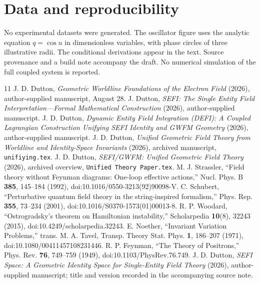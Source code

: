 \documentclass[11pt]{article}
\begin{document}
\section*{Data and reproducibility}
No experimental datasets were generated. The oscillator figure uses the analytic equation $q=\cos u$ in dimensionless variables, with phase circles of three illustrative radii. The conditional derivations appear in the text. Source provenance and a build note accompany the draft. No numerical simulation of the full coupled system is reported.
\begin{thebibliography}{11}
 J. D. Dutton, \textit{Geometric Worldline Foundations of the Electron Field} (2026), author-supplied manuscript, August 28.
 J. Dutton, \textit{SEFI: The Single Entity Field Interpretation---Formal Mathematical Construction} (2026), author-supplied manuscript.
 J. D. Dutton, \textit{Dynamic Entity Field Integration (DEFI): A Coupled Lagrangian Construction Unifying SEFI Identity and GWFM Geometry} (2026), author-supplied manuscript.
 J. D. Dutton, \textit{Unified Geometric Field Theory from Worldline and Identity-Space Invariants} (2026), archived manuscript, \texttt{unifiying.tex}.
 J. D. Dutton, \textit{SEFI/GWFM: Unified Geometric Field Theory} (2026), archived overview, \texttt{Unified Theory Paper.tex}.
 M. J. Strassler, ``Field theory without Feynman diagrams: One-loop effective actions,'' Nucl. Phys. B \textbf{385}, 145--184 (1992), doi:10.1016/0550-3213(92)90098-V.
 C. Schubert, ``Perturbative quantum field theory in the string-inspired formalism,'' Phys. Rep. \textbf{355}, 73--234 (2001), doi:10.1016/S0370-1573(01)00013-8.
 R. P. Woodard, ``Ostrogradsky's theorem on Hamiltonian instability,'' Scholarpedia \textbf{10}(8), 32243 (2015), doi:10.4249/scholarpedia.32243.
 E. Noether, ``Invariant Variation Problems,'' trans. M. A. Tavel, Transp. Theory Stat. Phys. \textbf{1}, 186--207 (1971), doi:10.1080/00411457108231446.
 R. P. Feynman, ``The Theory of Positrons,'' Phys. Rev. \textbf{76}, 749--759 (1949), doi:10.1103/PhysRev.76.749.
 J. D. Dutton, \textit{SEFI Space: A Geometric Identity Space for Single-Entity Field Theory} (2026), author-supplied manuscript; title and version recorded in the accompanying source note.
\end{thebibliography}
\end{document}
